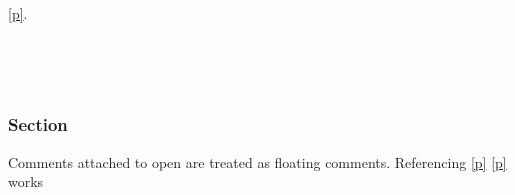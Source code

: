 \medbreak
\label{Toplevel_comments--module-Ref_in_synopsis}\label{Toplevel_comments-Ref_in_synopsis}\begin{ocamlindent}\label{Toplevel_comments-Ref_in_synopsis--type-t}\\
\end{ocamlindent}%
\begin{ocamlindent}\hyperref[Toplevel_comments-Ref_in_synopsis--type-t]{[p\pageref*{Toplevel_comments-Ref_in_synopsis--type-t}]}.\end{ocamlindent}%
\medbreak
\label{Toplevel_comments--module-Comments_on_open}\label{Toplevel_comments-Comments_on_open}\begin{ocamlindent}\label{Toplevel_comments-Comments_on_open--module-M}\label{Toplevel_comments-Comments_on_open-M}\begin{ocamlindent}\label{Toplevel_comments-Comments_on_open-M--type-t}\\
\end{ocamlindent}%
\\
\subsubsection{Section\label{Toplevel_comments-Comments_on_open--sec}}%
Comments attached to open are treated as floating comments. Referencing \hyperref[Toplevel_comments-Comments_on_open--sec]{[p\pageref*{Toplevel_comments-Comments_on_open--sec}]} \hyperref[Toplevel_comments-Comments_on_open-M--type-t]{[p\pageref*{Toplevel_comments-Comments_on_open-M--type-t}]} works

\end{ocamlindent}%
\\




